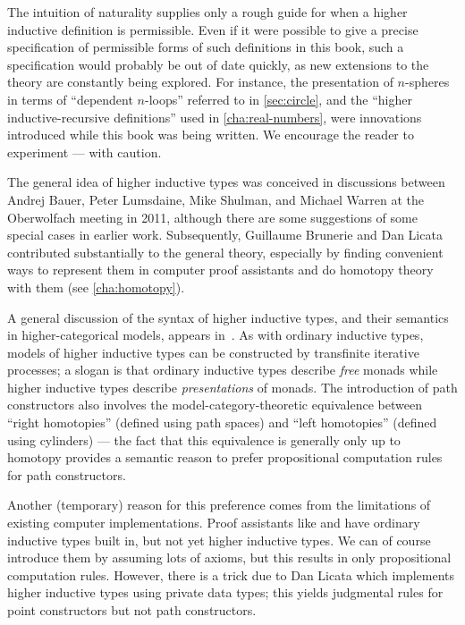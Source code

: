 The intuition of naturality supplies only a rough guide for when a higher inductive definition is permissible.
Even if it were possible to give a precise specification of permissible forms of such definitions in this book, such a specification would probably be out of date quickly, as new extensions to the theory are constantly being explored.
For instance, the presentation of $n$-spheres in terms of ``dependent $n$-loops'' referred to in \autoref{sec:circle}, and the ``higher inductive-recursive definitions'' used in \autoref{cha:real-numbers}, were innovations introduced while this book was being written.
We encourage the reader to experiment --- with caution.


\sectionNotes

The general idea of higher inductive types was conceived in discussions between Andrej Bauer, Peter Lumsdaine, Mike Shulman, and Michael Warren at the Oberwolfach meeting in 2011, although there are some suggestions of some special cases in earlier work.  Subsequently, Guillaume Brunerie and Dan Licata contributed substantially to the general theory, especially by finding convenient ways to represent them in computer proof assistants
and do homotopy theory with them (see \autoref{cha:homotopy}).

A general discussion of the syntax of higher inductive types, and their semantics in higher-categorical models, appears in~\cite{ls:hits}.
As with ordinary inductive types, models of higher inductive types can be constructed by transfinite iterative processes; a slogan is that ordinary inductive types describe \emph{free} monads while higher inductive types describe \emph{presentations} of monads.%
The introduction of path constructors also involves the model-category-theoretic equivalence between ``right homotopies'' (defined using path spaces) and ``left homotopies'' (defined using cylinders) --- the fact that this equivalence is generally only up to homotopy provides a semantic reason to prefer propositional computation rules for path constructors.

Another (temporary) reason for this preference comes from the limitations of existing computer implementations.
Proof assistants like \Coq and \Agda have ordinary inductive types built in, but not yet higher inductive types.
We can of course introduce them by assuming lots of axioms, but this results in only propositional computation rules.
However, there is a trick due to Dan Licata which implements higher inductive types using private data types; this yields judgmental rules for point constructors but not path constructors.

